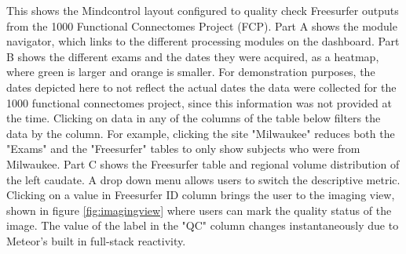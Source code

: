 \label{fig:dashboard}

This shows the Mindcontrol layout configured to quality check Freesurfer outputs from the 1000 Functional Connectomes Project (FCP). Part A shows the module navigator, which links to the different processing modules on the dashboard. Part B shows the different exams and the dates they were acquired, as a heatmap, where green is larger and orange is smaller. For demonstration purposes, the dates depicted here to not reflect the actual dates the data were collected for the 1000 functional connectomes project, since this information was not provided at the time. Clicking on data in any of the columns of the table below filters the data by the column. For example, clicking the site "Milwaukee" reduces both the "Exams" and the "Freesurfer" tables to only show subjects who were from Milwaukee. Part C shows the Freesurfer table and regional volume distribution of the left caudate. A drop down menu allows users to switch the descriptive metric. Clicking on a value in Freesurfer ID column brings the user to the imaging view, shown in figure \ref{fig:imagingview} where users can mark the quality status of the image. The value of the label in the "QC" column changes instantaneously due to Meteor's built in full-stack reactivity. 